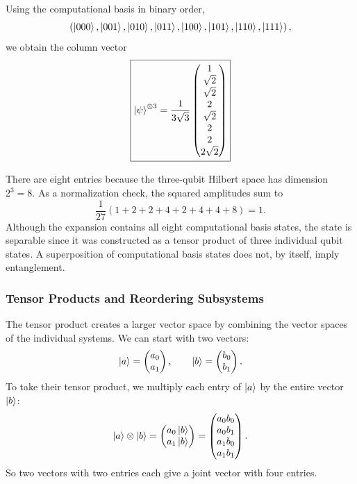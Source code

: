 \documentclass[11pt]{article}
\begin{document}
Using the computational basis in binary order,
\[
\left(
\ket{000},\ket{001},\ket{010},\ket{011},
\ket{100},\ket{101},\ket{110},\ket{111}
\right),
\]
we obtain the column vector
\[
\boxed{
\ket{\psi}^{\otimes 3}
=
\frac{1}{3\sqrt{3}}
\begin{pmatrix}
1\\
\sqrt{2}\\
\sqrt{2}\\
2\\
\sqrt{2}\\
2\\
2\\
2\sqrt{2}
\end{pmatrix}
}
\]

There are eight entries because the three-qubit Hilbert
space has dimension $2^3=8$. As a normalization check,
the squared amplitudes sum to
\[
\frac{1}{27}
\left(1+2+2+4+2+4+4+8\right)=1.
\]
Although the expansion contains all eight computational
basis states, the state is separable since it was constructed
as a tensor product of three individual qubit states.
A superposition of computational basis states does not,
by itself, imply entanglement.

\subsubsection{Tensor Products and Reordering Subsystems}
\label{ex:tensor-product-algorithm}

The tensor product creates a larger vector space by combining
the vector spaces of the individual systems. We can start
with two vectors:
\[
\ket{a}=
\begin{pmatrix}a_0\\a_1\end{pmatrix},
\qquad
\ket{b}=
\begin{pmatrix}b_0\\b_1\end{pmatrix}.
\]
To take their tensor product, we multiply each entry of
$\ket{a}$ by the entire vector $\ket{b}$:
\[
\ket{a}\otimes\ket{b}
=
\begin{pmatrix}
a_0\ket{b}\\
a_1\ket{b}
\end{pmatrix}
=
\begin{pmatrix}
a_0b_0\\
a_0b_1\\
a_1b_0\\
a_1b_1
\end{pmatrix}.
\]
So two vectors with two entries each give a joint vector
with four entries.
\end{document}
